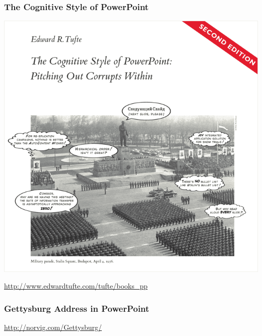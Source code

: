 \documentclass{beamer}
\begin{document}
\begin{frame}
\frametitle{The Cognitive Style of PowerPoint}

\begin{center}
\includegraphics[height=0.8\textheight]{book_pp_cover}

\url{http://www.edwardtufte.com/tufte/books_pp}
\end{center}

\end{frame}

\begin{frame}
\frametitle{Gettysburg Address in PowerPoint}

\begin{center}
\url{http://norvig.com/Gettysburg/}
\end{center}

\end{frame}
\end{document}
